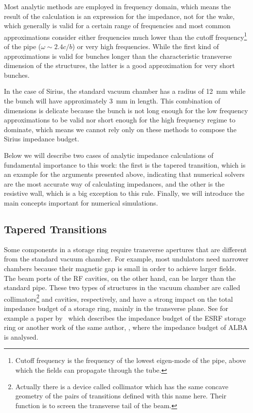     Most analytic methods are employed in frequency domain, which means the result of the calculation is an expression for the impedance, not for the wake, which generally is valid for a certain range of frequencies and most common approximations consider either frequencies much lower than the cutoff frequency\footnote{Cutoff frequency is the frequency of the lowest eigen-mode of the pipe, above which the fields can propagate through the tube.} of the pipe ($\omega\sim2.4c/b$) or very high frequencies. While the first kind of approximations is valid for bunches longer than the characteristic transverse dimension of the structures, the latter is a good approximation for very short bunches.

    In the case of Sirius, the standard vacuum chamber has a radius of \SI{12}{\milli\meter} while the bunch will have approximately \SI{3}{\milli\meter} in length. This combination of dimensions is delicate because the bunch is not long enough for the low frequency approximations to be valid nor short enough for the high frequency regime to dominate, which means we cannot rely only on these methods to compose the Sirius impedance budget.

    Below we will describe two cases of analytic impedance calculations of fundamental importance to this work: the first is the tapered transition, which is an example for the arguments presented above, indicating that numerical solvers are the most accurate way of calculating impedances, and the other is the resistive wall, which is a big exception to this rule. Finally, we will introduce the main concepts important for numerical simulations.

\subsection{Tapered Transitions}\label{ssec:tapered_transitions}

    Some components in a storage ring require transverse apertures that are different from the standard vacuum chamber. For example, most undulators need narrower chambers because their magnetic gap is small in order to achieve larger fields. The beam ports of the RF cavities, on the other hand, can be larger than the standard pipe. These two types of structures in the vacuum chamber are called collimators\footnote{Actually there is a device called collimator which has the same concave geometry of the pairs of transitions defined with this name here. Their function is to screen the transverse tail of the beam.} and cavities, respectively, and have a strong impact on the total impedance budget of a storage ring, mainly in the transverse plane. See for example a paper by~ which describes the impedance budget of the ESRF storage ring or another work of the same author, , where the impedance budget of ALBA is analysed.

